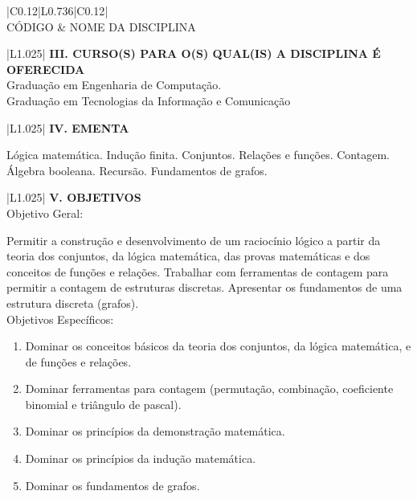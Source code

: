 \documentclass[12pt]{article}
\newcommand{\requisitoA}{}
\newcommand{\requisitoB}{}
\newcommand{\requisitoC}{}
\newcommand{\cursoA}{Graduação em Engenharia de Computação. \\ \hline}
\newcommand{\cursoB}{Graduação em Tecnologias da Informação e Comunicação \\ \hline}
\newcommand{\cursoC}{}
\newcommand{\ementa}{

Lógica matemática. Indução finita. Conjuntos. Relações e funções. Contagem. Álgebra booleana. Recursão. Fundamentos de grafos.
 \\ \hline
}
\begin{document}
\begin{longtable}{|C{0.12\textwidth}|L{0.736\textwidth}|C{0.12\textwidth}|} \hline
%
 \\ \hline
%
CÓDIGO & NOME DA DISCIPLINA \\ \hline	
%
\requisitoA
\requisitoB
\requisitoC
\end{longtable}


\begin{longtable}{|L{1.025\textwidth}|} \hline
%
{\bf III. CURSO(S) PARA O(S) QUAL(IS) A DISCIPLINA É OFERECIDA } \\ \hline
%
\cursoA 
\cursoB
\cursoC

\end{longtable}

\begin{longtable}{|L{1.025\textwidth}|} \hline
%
{\bf IV. EMENTA } \\ \hline
%
\ementa
\end{longtable}

\newpage



\begin{longtable}{|L{1.025\textwidth}|} \hline
%
{\bf V. OBJETIVOS } \\ \hline
%
Objetivo Geral:

Permitir a construção e desenvolvimento de um raciocínio lógico a partir da teoria dos conjuntos, da lógica matemática, das provas matemáticas e dos conceitos de funções e relações. Trabalhar com ferramentas de contagem para permitir a contagem de estruturas discretas. Apresentar os fundamentos de uma estrutura discreta (grafos). \\

Objetivos Específicos:
\begin{enumerate}
\item Dominar os conceitos básicos da teoria dos conjuntos, da lógica matemática, e de funções e relações.
\item Dominar ferramentas para contagem (permutação, combinação, coeficiente binomial e triângulo de pascal).
\item Dominar os princípios da demonstração matemática.
\item Dominar os princípios da indução matemática.
\item Dominar os fundamentos de grafos.
\end{enumerate}

\\ \hline
\end{longtable}
\end{document}
